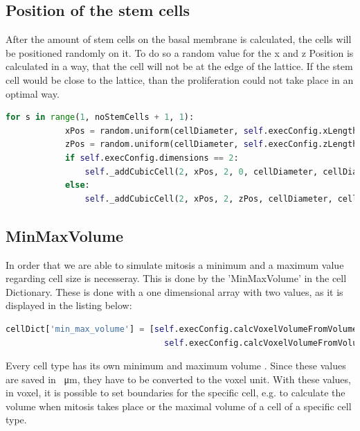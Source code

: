 \subsection{Position of the stem cells}
After the amount of stem cells on the basal membrane is calculated, the cells will be positioned randomly on it. To do so a random value for the x and z Position is calculated in a way, that the cell will not be at the edge of the lattice. If the stem cell would be close to the lattice, than the proliferation could not take place in an optimal way.
\begin{lstlisting}[language=Python, caption = stem cell position]
        for s in range(1, noStemCells + 1, 1):
            xPos = random.uniform(cellDiameter, self.execConfig.xLength - cellDiameter)
            zPos = random.uniform(cellDiameter, self.execConfig.zLength - cellDiameter)
            if self.execConfig.dimensions == 2:
                self._addCubicCell(2, xPos, 2, 0, cellDiameter, cellDiameter, 0, steppable)
            else:
                self._addCubicCell(2, xPos, 2, zPos, cellDiameter, cellDiameter, cellDiameter, steppable)
\end{lstlisting}                


\subsection{MinMaxVolume}
In order that we are able to simulate mitosis a minimum and a maximum value regarding cell size is necesseray. This is done by the 'MinMaxVolume' in the cell Dictionary. These is done with a one dimensional array with two values, as it is displayed in the listing below:
\begin{lstlisting}[language=Python, caption = MinMaxVolume]
cellDict['min_max_volume'] = [self.execConfig.calcVoxelVolumeFromVolume(cellType.minVol),
								self.execConfig.calcVoxelVolumeFromVolume(cellType.maxVol)]
\end{lstlisting} 
Every cell type has its own minimum and maximum volume \cite{Torelli2017}. Since these values are saved in \SI{}{\micro\metre}, they have to be converted to the voxel unit. With these values, in voxel, it is possible to set boundaries for the specific cell, e.g. to calculate the volume when mitosis takes place or the maximal volume of a cell of a specific cell type.

